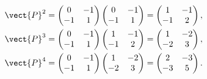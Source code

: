 \begin{enumerate}
\begin{enumerate}
                    \begin{align*}
                        \vect{P}^2 & = \begin{pmatrix}
                                           0 & -1 \\ -1 & 1
                                       \end{pmatrix} \begin{pmatrix}
                                                         0 & -1 \\ -1 & 1
                                                     \end{pmatrix} = \begin{pmatrix}
                                                                         1 & -1 \\ -1 & 2
                                                                     \end{pmatrix}, \\
                        \vect{P}^3 & = \begin{pmatrix}
                                           0 & -1 \\ -1 & 1
                                       \end{pmatrix} \begin{pmatrix}
                                                         1 & -1 \\ -1 & 2
                                                     \end{pmatrix} = \begin{pmatrix}
                                                                         1 & -2 \\ -2 & 3
                                                                     \end{pmatrix}, \\
                        \vect{P}^4 & = \begin{pmatrix}
                                           0 & -1 \\ -1 & 1
                                       \end{pmatrix} \begin{pmatrix}
                                                         1 & -2 \\ -2 & 3
                                                     \end{pmatrix} = \begin{pmatrix}
                                                                         2 & -3 \\ -3 & 5
                                                                     \end{pmatrix}.
                    \end{align*}


\end{enumerate}
\end{enumerate}
